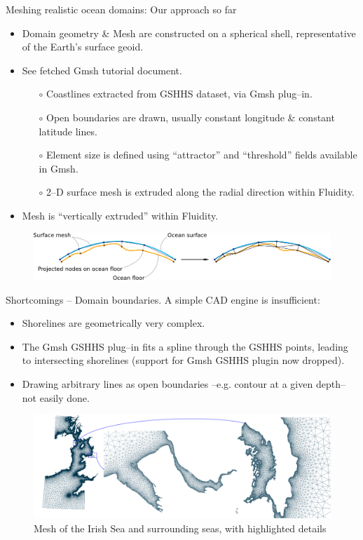 \documentclass[t]{beamer}
\begin{document}
\begin{frame}{Meshing realistic ocean domains: Our approach so far}
\begin{itemize}
\item Domain geometry \& Mesh are constructed on a spherical shell, representative of the Earth's surface geoid.
\item See fetched Gmsh tutorial document.
\begin{itemize}
   \item[$\circ$] Coastlines extracted from GSHHS dataset, via Gmsh plug--in.
   \item[$\circ$] Open boundaries are drawn, usually constant longitude \& constant latitude lines.
   \item[$\circ$] Element size is defined using ``attractor'' and ``threshold'' fields available in Gmsh.
   \item[$\circ$] 2--D surface mesh is extruded along the radial direction within Fluidity.
\end{itemize}
\item Mesh is ``vertically extruded'' within Fluidity.
\end{itemize}
\begin{figure}[htbp!]
 \centering
  \includegraphics[width=1.0\textwidth]{../figures/mesh_extrusion.png}
\end{figure}
\end{frame}

\begin{frame}{Shortcomings -- Domain boundaries.}
A simple CAD engine is insufficient:
\begin{itemize}
   \item Shorelines are geometrically very complex.
   \item The Gmsh GSHHS plug--in fits a spline through the GSHHS points, leading to intersecting shorelines (support for Gmsh GSHHS plugin now dropped).
   \item Drawing arbitrary lines as open boundaries --e.g. contour at a given depth-- not easily done.
\end{itemize}
\begin{figure}[htbp]
 \centering
  \includegraphics[width=1.00\textwidth]{../figures/UKwc_mesh_with_details/UK_west_coast_with_details}
  \caption{Mesh of the Irish Sea and surrounding seas, with highlighted details}
  \label{fig:IrishSeaMesh}
\end{figure}
\end{frame}
\end{document}
